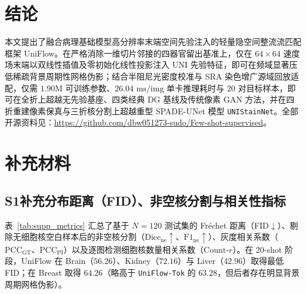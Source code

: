 \documentclass[journal]{IEEEtran}
\newcommand{\methodname}{UniFlow}
\begin{document}
\section{结论}
本文提出了融合病理基础模型高分辨率末端空间先验注入的轻量隐空间整流流匹配框架 \methodname{}。在严格消除一维切片邻接的四器官留出基准上，仅在 $64\times 64$ 速度场末端以双线性插值及零初始化线性投影注入 UNI 先验特征，即可在频域显著压低稀疏背景周期性网格伪影；结合半阻尼光密度校准与 SRA 染色增广源域回放适配，仅需 $1.90\text{M}$ 可训练参数、$26.04\text{ ms/img}$ 单卡推理耗时与 20 对目标样本，即可在全折上超越无先验基座、四类经典 DG 基线及传统像素 GAN 方法，并在四折重建像素保真与三折核分割上超越重型 SPADE-UNet 模型 \texttt{UNIStainNet}。全部开源资料见：\url{https://github.com/dbw051273-sudo/Few-shot-supervised}。

\appendices
\section*{补充材料}

\subsection*{S1\quad 补充分布距离（FID）、非空核分割与相关性指标}
表~\ref{tab:supp_metrics} 汇总了基于 $N=120$ 测试集的 Fréchet 距离（FID$\downarrow$）、剔除无细胞核空白样本后的非空核分割（$\text{Dice}_{\text{ne}}\uparrow$、$\text{F1}_{\text{ne}}\uparrow$）、灰度相关系数（$\text{PCC}_{\text{GT}}$、$\text{PCC}_{\text{PI}}$）以及逐图检测细胞核数量相关系数（$\text{Count-}r$）。在 20-shot 阶段，\methodname{} 在 Brain（$56.26$）、Kidney（$72.16$）与 Liver（$42.96$）取得最低 FID；在 Breast 取得 $64.26$（略高于 \texttt{UniFlow-Tok} 的 $63.28$，但后者存在明显背景周期网格伪影）。
\end{document}
